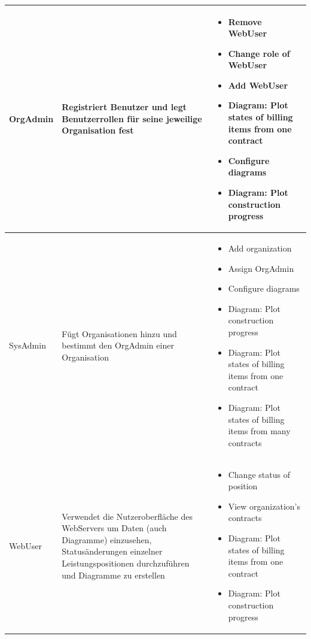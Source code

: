 \begin{longtable}[c]{|p{2cm}|p{6cm}|p{6cm}|}
    OrgAdmin        & Registriert Benutzer und legt Benutzerrollen für seine jeweilige Organisation fest                                                                                                      &
    \begin{itemize}
        \item Remove WebUser
        \item Change role of WebUser
        \item Add WebUser
        \item Diagram: Plot states of billing items from one contract
        \item Configure diagrams
        \item Diagram: Plot construction progress
    \end{itemize}                                                                                                                                                                                                                        \\ \hline
    SysAdmin        & F\"ugt Organisationen hinzu und bestimmt den OrgAdmin einer Organisation                                                                                                     &
    \begin{itemize}
        \item Add organization
        \item Assign OrgAdmin
        \item Configure diagrams
        \item Diagram: Plot construction progress
        \item Diagram: Plot states of billing items from one contract
        \item Diagram: Plot states of billing items from many contracts
    \end{itemize}                                                                                                                                                                                                                        \\ \hline
    WebUser         & Verwendet die Nutzeroberfl\"ache des WebServers um Daten (auch Diagramme) einzusehen,  Status\"anderungen einzelner Leistungspositionen durchzuf\"uhren und Diagramme zu erstellen      &
    \begin{itemize}
        \item Change status of position
        \item View organization's contracts
        \item Diagram: Plot states of billing items from one contract
        \item Diagram: Plot construction progress
    \end{itemize}                                                                                                                                                                                                                        \\\hline
\end{longtable}

